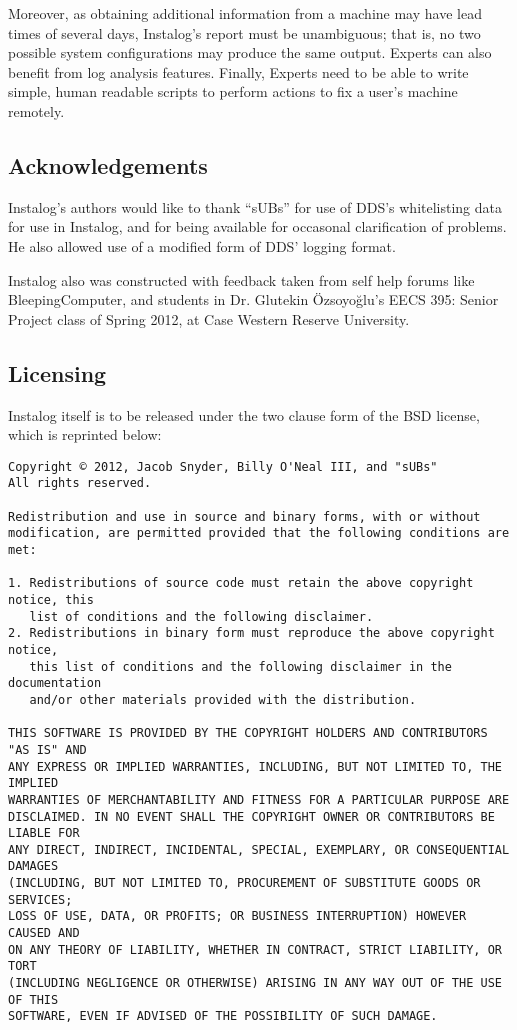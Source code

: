 \documentclass[letterpaper,12pt]{article}
\begin{document}
Moreover, as obtaining additional information from a machine may
have lead times of several days, Instalog's report must be unambiguous; that is,
no two possible system configurations may produce the same output. Experts can
also benefit from log analysis features. Finally, Experts need to be able to
write simple, human readable scripts to perform actions to fix a user's machine
remotely.

\subsection{Acknowledgements}
Instalog's authors would like to thank ``sUBs'' for use of DDS's whitelisting
data for use in Instalog, and for being available for occasonal clarification
of problems. He also allowed use of a modified form of DDS' logging format.

Instalog also was constructed with feedback taken from self help forums like
BleepingComputer, and students in Dr. Glutekin Özsoyoğlu's EECS 395: Senior
Project class of Spring 2012, at Case Western Reserve University.

\subsection{Licensing}
Instalog itself is to be released under the two clause form of the BSD license,
which is reprinted below:

\begin{verbatim}
Copyright © 2012, Jacob Snyder, Billy O'Neal III, and "sUBs"
All rights reserved.

Redistribution and use in source and binary forms, with or without
modification, are permitted provided that the following conditions are met: 

1. Redistributions of source code must retain the above copyright notice, this
   list of conditions and the following disclaimer. 
2. Redistributions in binary form must reproduce the above copyright notice,
   this list of conditions and the following disclaimer in the documentation
   and/or other materials provided with the distribution. 

THIS SOFTWARE IS PROVIDED BY THE COPYRIGHT HOLDERS AND CONTRIBUTORS "AS IS" AND
ANY EXPRESS OR IMPLIED WARRANTIES, INCLUDING, BUT NOT LIMITED TO, THE IMPLIED
WARRANTIES OF MERCHANTABILITY AND FITNESS FOR A PARTICULAR PURPOSE ARE
DISCLAIMED. IN NO EVENT SHALL THE COPYRIGHT OWNER OR CONTRIBUTORS BE LIABLE FOR
ANY DIRECT, INDIRECT, INCIDENTAL, SPECIAL, EXEMPLARY, OR CONSEQUENTIAL DAMAGES
(INCLUDING, BUT NOT LIMITED TO, PROCUREMENT OF SUBSTITUTE GOODS OR SERVICES;
LOSS OF USE, DATA, OR PROFITS; OR BUSINESS INTERRUPTION) HOWEVER CAUSED AND
ON ANY THEORY OF LIABILITY, WHETHER IN CONTRACT, STRICT LIABILITY, OR TORT
(INCLUDING NEGLIGENCE OR OTHERWISE) ARISING IN ANY WAY OUT OF THE USE OF THIS
SOFTWARE, EVEN IF ADVISED OF THE POSSIBILITY OF SUCH DAMAGE.
\end{verbatim}
\end{document}

